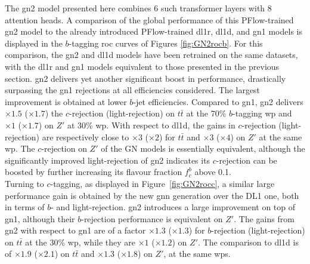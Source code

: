 The \gls{gn2} model presented here combines 6 such transformer layers with 8 attention heads. A comparison of the global performance of this PFlow-trained \gls{gn2} model to the already introduced PFlow-trained \gls{dl1r}, \gls{dl1d}, and \gls{gn1} models is displayed in the $b$-tagging \gls{roc} curves of Figures \ref{fig:GN2rocb}. For this comparison, the \gls{gn2} and \gls{dl1d} models have been retrained on the same datasets, with the \gls{dl1r} and \gls{gn1} models equivalent to those presented in the previous section. \gls{gn2} delivers yet another significant boost in performance, drastically surpassing the \gls{gn1} rejections at all efficiencies considered. The largest improvement is obtained at lower $b$-jet efficiencies. Compared to \gls{gn1}, \gls{gn2} delivers $\times 1.5$ ($\times 1.7$) the $c$-rejection (light-rejection) on $t\bar{t}$ at the 70\% $b$-tagging \gls{wp} and $\times 1$ ($\times 1.7$) on $Z'$ at 30\% \gls{wp}. With respect to \gls{dl1d}, the gains in $c$-rejection (light-rejection) are respectively close to $\times 3$ ($\times 2$) for $t\bar{t}$ and $\times 3$ ($\times 4$) on $Z'$ at the same \gls{wp}. The $c$-rejection on $Z'$ of the GN models is essentially equivalent, although the significantly improved light-rejection of \gls{gn2} indicates its $c$-rejection can be boosted by further increasing its flavour fraction $f^b_c$ above 0.1. \\

Turning to $c$-tagging, as displayed in Figure~\ref{fig:GN2rocc}, a similar large performance gain is obtained by the new \gls{gnn} generation over the DL1 one, both in terms of $b$- and light-rejection. \gls{gn2} introduces a large improvement on top of \gls{gn1}, although their $b$-rejection performance is equivalent on $Z'$. The gains from \gls{gn2} with respect to \gls{gn1} are of a factor $\times 1.3$ ($\times 1.3$) for $b$-rejection (light-rejection) on $t\bar{t}$ at the 30\% \gls{wp}, while they are $\times 1$ ($\times 1.2$) on $Z'$. The comparison to \gls{dl1d} is of $\times 1.9$ ($\times 2.1$) on $t\bar{t}$ and $\times 1.3$ ($\times 1.8$) on $Z'$, at the same \glspl{wp}. \\


